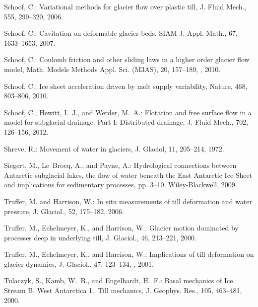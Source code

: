\documentclass[gmd]{copernicus}   %
\begin{document}
\begin{thebibliography}{}
Schoof, C.: Variational methods for glacier flow over plastic till, J. Fluid
  Mech., 555, 299--320, 2006{}.

Schoof, C.: Cavitation on deformable glacier beds, SIAM J. Appl. Math., 67,
  1633--1653, 2007.

Schoof, C.: Coulomb friction and other sliding laws in a higher order glacier
  flow model, Math. Models Methods Appl. Sci. (M3AS), 20, 157--189,
  , 2010{}.

Schoof, C.: Ice sheet acceleration driven by melt supply variability, Nature,
  468, 803--806, 2010{}.

Schoof, C., Hewitt, I.~J., and Werder, M.~A.: Flotation and free surface flow
  in a model for subglacial drainage. {P}art {I}: {D}istributed drainage, J.
  Fluid Mech., 702, 126--156, 2012.

Shreve, R.: Movement of water in glaciers, J. Glaciol, 11, 205--214, 1972.

Siegert, M., Le~Brocq, A., and Payne, A.: Hydrological connections between
  Antarctic subglacial lakes, the flow of water beneath the East Antarctic Ice
  Sheet and implications for sedimentary processes, pp. 3--10, Wiley-Blackwell,
  2009.

Truffer, M. and Harrison, W.: In situ measurements of till deformation and
  water pressure, J. Glaciol., 52, 175--182, 2006.

Truffer, M., Echelmeyer, K., and Harrison, W.: Glacier motion dominated by
  processes deep in underlying till, J. Glaciol., 46, 213--221, 2000.

Truffer, M., Echelmeyer, K., and Harrison, W.: Implications of till deformation
  on glacier dynamics, J. Glaciol., 47, 123--134,
  , 2001.

Tulaczyk, S., Kamb, W.~B., and Engelhardt, H.~F.: Basal mechanics of {I}ce
  {S}tream {B}, {W}est {A}ntarctica 1.~{T}ill mechanics, J. Geophys. Res., 105,
  463--481, 2000{}.


\end{thebibliography}
\end{document}
